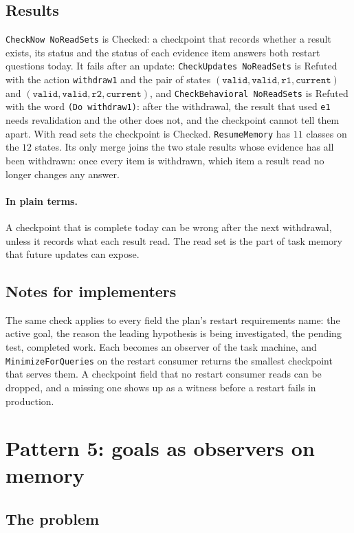 \documentclass[11pt]{article}
\newcommand{\code}[1]{\texttt{#1}}
\newcommand{\plain}{\paragraph{In plain terms.}}
\theoremstyle{definition}
\theoremstyle{plain}
\begin{document}
\subsection{Results}

\code{CheckNow NoReadSets} is Checked: a checkpoint that records whether a result exists, its
status and the status of each evidence item answers both restart questions today. It fails after
an update: \code{CheckUpdates NoReadSets} is Refuted with the action \code{withdraw1} and the pair of states
$(\code{valid},\code{valid},\code{r1},\code{current})$ and
$(\code{valid},\code{valid},\code{r2},\code{current})$, and \code{CheckBehavioral NoReadSets} is
Refuted with the word \code{(Do withdraw1)}: after the
withdrawal, the result that used \code{e1} needs revalidation and the other does not, and the
checkpoint cannot tell them apart. With read sets the checkpoint is Checked. \code{ResumeMemory}
has $11$ classes on the $12$ states. Its only merge joins the two stale results whose evidence has
all been withdrawn: once every item is withdrawn, which item a result read no longer changes any
answer.

\plain A checkpoint that is complete today can be wrong after the next withdrawal, unless it
records what each result read. The read set is the part of task memory that future updates can
expose.

\subsection{Notes for implementers}

The same check applies to every field the plan's restart requirements name: the active goal, the
reason the leading hypothesis is being investigated, the pending test, completed work. Each becomes
an observer of the task machine, and \code{MinimizeForQueries} on the restart consumer returns the
smallest checkpoint that serves them. A checkpoint field that no restart consumer reads can be
dropped, and a missing one shows up as a witness before a restart fails in production.

\section{Pattern 5: goals as observers on memory}\label{sec:p5}

\subsection{The problem}
\end{document}
